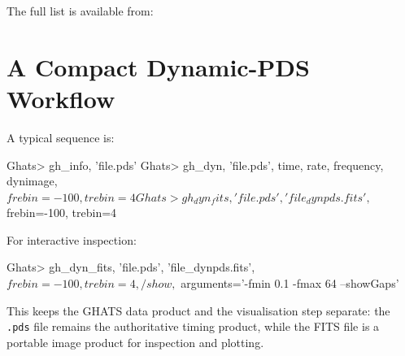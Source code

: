 The full list is available from:


\section{A Compact Dynamic-PDS Workflow}

A typical sequence is:

\begin{ghatsconsole}
Ghats> gh_info, 'file.pds'
Ghats> gh_dyn, 'file.pds', time, rate, frequency, dynimage, $
       frebin=-100, trebin=4
Ghats> gh_dyn_fits, 'file.pds', 'file_dynpds.fits', $
       frebin=-100, trebin=4
\end{ghatsconsole}

For interactive inspection:

\begin{ghatsconsole}
Ghats> gh_dyn_fits, 'file.pds', 'file_dynpds.fits', $
       frebin=-100, trebin=4, /show, $
       arguments='-fmin 0.1 -fmax 64 --showGaps'
\end{ghatsconsole}

This keeps the GHATS data product and the visualisation step separate: the
\texttt{.pds} file remains the authoritative timing product, while the FITS
file is a portable image product for inspection and plotting.
